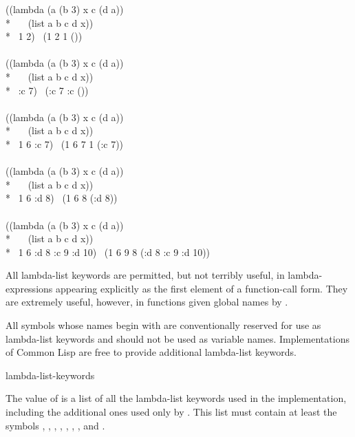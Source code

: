 \begin{lisp}
((lambda (a  (b 3)  x  c (d a)) \\*
~~~(list a b c d x)) \\*
~1 2)   \EV\ (1 2 {\nil} 1 ()) \\
 \\
((lambda (a  (b 3)  x  c (d a)) \\*
~~~(list a b c d x)) \\*
~:c 7)   \EV\ (:c 7 {\nil} :c ()) \\
 \\
((lambda (a  (b 3)  x  c (d a)) \\*
~~~(list a b c d x)) \\*
~1 6 :c 7)   \EV\ (1 6 7 1 (:c 7)) \\
 \\
((lambda (a  (b 3)  x  c (d a)) \\*
~~~(list a b c d x)) \\*
~1 6 :d 8)   \EV\ (1 6 {\nil} 8 (:d 8)) \\
 \\
((lambda (a  (b 3)  x  c (d a)) \\*
~~~(list a b c d x)) \\*
~1 6 :d 8 :c 9 :d 10)   \EV\ (1 6 9 8 (:d 8 :c 9 :d 10))
\end{lisp}

All lambda-list keywords are permitted, but not terribly useful, in
lambda-expressions appearing explicitly as the first element of a
function-call form.  They are extremely
useful, however, in functions given global names by .

All symbols whose names begin with \cd{\&} are conventionally reserved
for use as lambda-list keywords and should not be used as variable names.
Implementations of Common Lisp are free to provide additional lambda-list
keywords.

\begin{defun}[Constant]
lambda-list-keywords

The value of  is a list of all the lambda-list
keywords used in the implementation, including the additional ones
used only by .  This list must contain at least the symbols
, , , , , , ,
and .
\end{defun}

